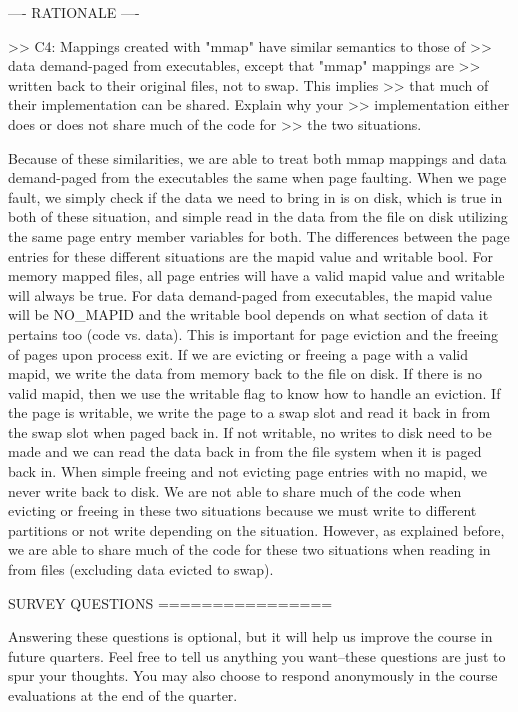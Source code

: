 ---- RATIONALE ----

>> C4: Mappings created with "mmap" have similar semantics to those of
>> data demand-paged from executables, except that "mmap" mappings are
>> written back to their original files, not to swap.  This implies
>> that much of their implementation can be shared.  Explain why your
>> implementation either does or does not share much of the code for
>> the two situations.

Because of these similarities, we are able to treat both mmap mappings
and data demand-paged from the executables the same when page faulting.
When we page fault, we simply check if the data we need to bring in is
on disk, which is true in both of these situation, and simple read in
the data from the file on disk utilizing the same page entry member
variables for both. The differences between the page entries for
these different situations are the mapid value and writable bool. For 
memory mapped files, all page entries will have a valid mapid value and
writable will always be true. For data demand-paged from executables, 
the mapid value will be NO_MAPID and the writable bool depends on what
section of data it pertains too (code vs. data). This is important for
page eviction and the freeing of pages upon process exit. If we are 
evicting or freeing a page with a valid mapid, we write the data from
memory back to the file on disk. If there is no valid mapid, then we 
use the writable flag to know how to handle an eviction. If the page is
writable, we write the page to a swap slot and read it back in from the
swap slot when paged back in. If not writable, no writes to disk need to be
made and we can read the data back in from the file system when it is paged
back in. When simple freeing and not evicting page entries with no mapid,
we never write back to disk. We are not able to share much of the code
when evicting or freeing in these two situations because we must write to
different partitions or not write depending on the situation. However,
as explained before, we are able to share much of the code for these two
situations when reading in from files (excluding data evicted to swap).

               SURVEY QUESTIONS
               ================

Answering these questions is optional, but it will help us improve the
course in future quarters.  Feel free to tell us anything you
want--these questions are just to spur your thoughts.  You may also
choose to respond anonymously in the course evaluations at the end of
the quarter.


